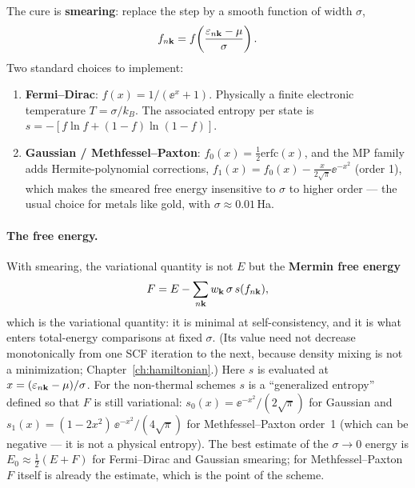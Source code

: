 The cure is \textbf{smearing}: replace the step by a smooth function of width
$\sigma$,
\begin{equation}
f_{n\mathbf{k}} = f\!\left(\frac{\varepsilon_{n\mathbf{k}} - \mu}{\sigma}\right).
\end{equation}
Two standard choices to implement:
\begin{enumerate}[leftmargin=2em]
\item \textbf{Fermi--Dirac}: $f(x) = 1/(\ee^{x} + 1)$. Physically a finite
electronic temperature $T = \sigma/k_B$. The associated entropy per state is
$s = -[f \ln f + (1-f)\ln(1-f)]$.
\item \textbf{Gaussian / Methfessel--Paxton}: $f_0(x) = \tfrac12
\mathrm{erfc}(x)$, and the MP family adds Hermite-polynomial corrections,
$f_1(x) = f_0(x) - \tfrac{x}{2\sqrt\pi} \ee^{-x^2}$ (order 1), which makes the
smeared free energy insensitive to $\sigma$ to higher order --- the usual
choice for metals like gold, with $\sigma \approx 0.01$\,Ha.
\end{enumerate}

\paragraph{The free energy.} With smearing, the variational quantity is not
$E$ but the \textbf{Mermin free energy}
\begin{equation}
F = E - \sum_{n\mathbf{k}} w_{\mathbf{k}}\, \sigma\, s(f_{n\mathbf{k}}),
\label{eq:mermin}
\end{equation}
which is the variational quantity: it is minimal at self-consistency,
and it is what enters total-energy comparisons at fixed $\sigma$. (Its
value need not decrease monotonically from one SCF iteration to the next,
because density mixing is not a minimization;
Chapter~\ref{ch:hamiltonian}.) Here $s$ is evaluated at $x = (\varepsilon_{n\mathbf{k}}-\mu)/\sigma$. For the
non-thermal schemes $s$ is a ``generalized entropy'' defined so that $F$ is
still variational:
$s_0(x) = \ee^{-x^2}/(2\sqrt{\pi})$ for Gaussian and
$s_1(x) = (1 - 2x^2)\,\ee^{-x^2}/(4\sqrt{\pi})$ for Methfessel--Paxton
order~1 (which can be negative --- it is not a physical entropy). The best
estimate of the $\sigma\to0$ energy is $E_0 \approx \tfrac12 (E + F)$ for
Fermi--Dirac and Gaussian smearing; for Methfessel--Paxton $F$ itself is
already the estimate, which is the point of the scheme.

